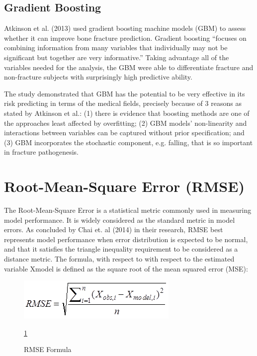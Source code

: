 \documentclass[10pt,11pt,12pt,oneside]{book}
\begin{document}
        \subsection{Gradient Boosting}
        Atkinson et al. (2013) used gradient boosting machine models (GBM) to assess whether it can improve bone fracture prediction. Gradient boosting “focuses on combining information from many variables that individually may not be significant but together are very informative.” Taking advantage all of the variables needed for the analysis, the GBM were able to differentiate fracture and non-fracture subjects with surprisingly high predictive ability.

        The study demonstrated that GBM has the potential to be very effective in its risk predicting in terms of the medical fields, precisely because of 3 reasons as stated by Atkinson et al.: (1) there is evidence that boosting methods are one of the approaches least affected by overfitting; (2) GBM models’ non-linearity and interactions between variables can be captured without prior specification; and (3) GBM incorporates the stochastic component, e.g. falling, that is so important in fracture pathogenesis. \cite{Atkinson2012}
    \section{Root-Mean-Square Error (RMSE)}
    The Root-Mean-Square Error is a statistical metric commonly used in measuring model performance. It is widely considered as the standard metric in model errors. As concluded by Chai et. al (2014) in their research, RMSE best represents model performance when error distribution is expected to be normal, and that it satisfies the triangle inequality requirement to be considered as a distance metric. The formula, with respect to with respect to the estimated variable Xmodel is defined as the square root of the mean squared error (MSE):
                           \begin{figure}
         \includegraphics[width=\linewidth]{rmseformula.png}
         \caption{RMSE Formula}
         \label{fig:formula}

             \ref{fig:formula}
\end{figure}
\end{document}
